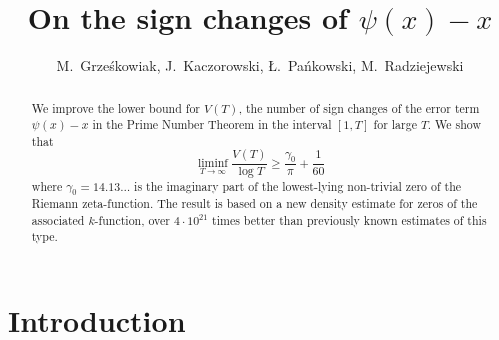 \documentclass[oneside,english]{amsart}
\numberwithin{equation}{section}
\numberwithin{figure}{section}
\theoremstyle{plain}
\theoremstyle{plain}
\theoremstyle{plain}
\theoremstyle{definition}
\begin{document}
\title{On the sign changes of $\psi(x)-x$}
\author{M.~Grześkowiak, J.~Kaczorowski, Ł.~Pańkowski, M.~Radziejewski}
\begin{abstract}
We improve the lower bound for $V(T)$, the number of sign changes
of the error term $\psi(x)-x$ in the Prime Number Theorem in the
interval $[1,T]$ for large $T$. We show that
\[
\liminf_{T\to\infty}\frac{V(T)}{\log T}\geq\frac{\gamma_{0}}{\pi}+\frac{1}{60}
\]
where $\gamma_{0}=14.13\ldots$ is the imaginary part of the lowest-lying
non-trivial zero of the Riemann zeta-function. The result is based
on a new density estimate for zeros of the associated $k$-function,
over $4\cdot10^{21}$ times better than previously known estimates
of this type.
\end{abstract}

\begingroup
\def\uppercasenonmath#1{} %
\let\MakeUppercase\relax %
\maketitle
\endgroup


\section{Introduction}
\end{document}
